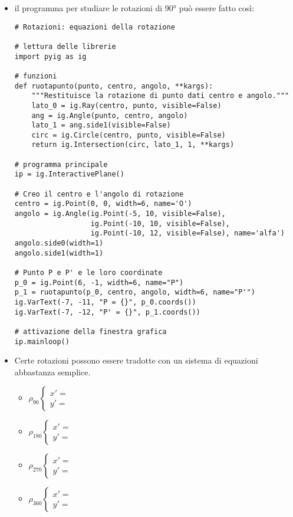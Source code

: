 \begin{itemize} [noitemsep]
\item il programma per studiare le rotazioni di 90° può essere fatto così:
\begin{lstlisting}
# Rotazioni: equazioni della rotazione

# lettura delle librerie
import pyig as ig

# funzioni
def ruotapunto(punto, centro, angolo, **kargs):
    """Restituisce la rotazione di punto dati centro e angolo."""
    lato_0 = ig.Ray(centro, punto, visible=False)
    ang = ig.Angle(punto, centro, angolo)
    lato_1 = ang.side1(visible=False)
    circ = ig.Circle(centro, punto, visible=False)
    return ig.Intersection(circ, lato_1, 1, **kargs)
  
# programma principale
ip = ig.InteractivePlane()

# Creo il centro e l'angolo di rotazione
centro = ig.Point(0, 0, width=6, name='O')
angolo = ig.Angle(ig.Point(-5, 10, visible=False),
                  ig.Point(-10, 10, visible=False),
                  ig.Point(-10, 12, visible=False), name='alfa')
angolo.side0(width=1)
angolo.side1(width=1)

# Punto P e P' e le loro coordinate
p_0 = ig.Point(6, -1, width=6, name="P")
p_1 = ruotapunto(p_0, centro, angolo, width=6, name="P'")
ig.VarText(-7, -11, "P = {}", p_0.coords())
ig.VarText(-7, -12, "P' = {}", p_1.coords())

# attivazione della finestra grafica
ip.mainloop()
\end{lstlisting}
\item Certe rotazioni possono essere tradotte con un sistema di equazioni
abbastanza semplice.
\begin{itemize}\setlength{\itemsep}{0pt}\setlength{\parskip}{0pt}
\item \(\rho_{90} \left \{
\begin{array}{l} x' =  \\ y' =  \end{array} \right .\)
\item \(\rho_{180} \left \{
\begin{array}{l} x' =  \\ y' =  \end{array} \right .\)
\item \(\rho_{270} \left \{
\begin{array}{l} x' =  \\ y' =  \end{array} \right .\)
\item \(\rho_{360} \left \{
\begin{array}{l} x' =  \\ y' =  \end{array} \right .\)
\end{itemize}
\end{itemize}

